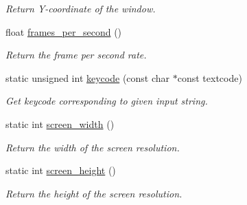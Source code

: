 \begin{DoxyCompactItemize}
\begin{DoxyCompactList}\small\item\em Return Y-\/coordinate of the window. \item\end{DoxyCompactList}\item 
\hypertarget{structcimg__library_1_1CImgDisplay_a3ade6e852b67fea14093915c5dca7862}{
float \hyperlink{structcimg__library_1_1CImgDisplay_a3ade6e852b67fea14093915c5dca7862}{frames\_\-per\_\-second} ()}
\label{structcimg__library_1_1CImgDisplay_a3ade6e852b67fea14093915c5dca7862}

\begin{DoxyCompactList}\small\item\em Return the frame per second rate. \item\end{DoxyCompactList}\item 
\hypertarget{structcimg__library_1_1CImgDisplay_aa50e87a914abfa8af110579efe731032}{
static unsigned int \hyperlink{structcimg__library_1_1CImgDisplay_aa50e87a914abfa8af110579efe731032}{keycode} (const char $\ast$const textcode)}
\label{structcimg__library_1_1CImgDisplay_aa50e87a914abfa8af110579efe731032}

\begin{DoxyCompactList}\small\item\em Get keycode corresponding to given input string. \item\end{DoxyCompactList}\item 
\hypertarget{structcimg__library_1_1CImgDisplay_a4219f41cd905bbaabaab92b2ed1a70aa}{
static int \hyperlink{structcimg__library_1_1CImgDisplay_a4219f41cd905bbaabaab92b2ed1a70aa}{screen\_\-width} ()}
\label{structcimg__library_1_1CImgDisplay_a4219f41cd905bbaabaab92b2ed1a70aa}

\begin{DoxyCompactList}\small\item\em Return the width of the screen resolution. \item\end{DoxyCompactList}\item 
\hypertarget{structcimg__library_1_1CImgDisplay_a8c14a95f72679922995641b29d860da1}{
static int \hyperlink{structcimg__library_1_1CImgDisplay_a8c14a95f72679922995641b29d860da1}{screen\_\-height} ()}
\label{structcimg__library_1_1CImgDisplay_a8c14a95f72679922995641b29d860da1}

\begin{DoxyCompactList}\small\item\em Return the height of the screen resolution. \item\end{DoxyCompactList}\end{DoxyCompactItemize}
